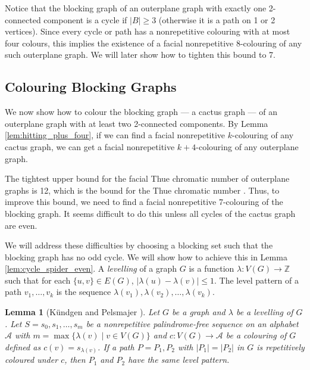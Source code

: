 \documentclass{patmorin}
\newcommand{\integers}{\mathbb{Z}}
\newtheorem{lemma}[theorem]{Lemma}
\begin{document}
Notice that the blocking graph of an outerplane graph with exactly one 2-conn\-ected component is a cycle if $|B|\geq 3$ (otherwise it is a path on 1 or 2 vertices). Since every cycle or path has a nonrepetitive colouring with at most four colours, this implies the existence of a facial nonrepetitive 8-colouring of any such outerplane graph. We will later show how to tighten this bound to 7.

\subsection{Colouring Blocking Graphs}

We now show how to colour the blocking graph --- a cactus graph --- of an outerplane graph with at least two 2-connected components.
By Lemma \ref{lem:hitting_plus_four}, if we can find a facial nonrepetitive $k$-colouring of any cactus graph, we can get a facial nonrepetitive $k+4$-colouring of any outerplane graph. 

The tightest upper bound for the facial Thue chromatic number of outerplane graphs is 12, which is the bound for the Thue chromatic number \cite{barat2007square, kundgen2008nonrepetitive}. Thus, to improve this bound, we need to find a facial nonrepetitive 7-colouring of the blocking graph. It seems difficult to do this unless all cycles of the cactus graph are even. 

We will address these difficulties by choosing a blocking set such that the blocking graph has no odd cycle. We will show how to achieve this in Lemma \ref{lem:cycle_spider_even}. 
A \emph{levelling} of a graph $G$ is a function $\lambda : V(G) \rightarrow \integers$ such that for each $\{u,v\}\in E(G)$, $|\lambda(u)-\lambda(v)|\leq 1$. The level pattern of a path $v_1,\ldots,v_k$ is the sequence $\lambda(v_1),\lambda(v_2),\ldots,\lambda(v_k)$.

\begin{lemma}[K{\"u}ndgen and Pelsmajer \cite{kundgen2008nonrepetitive}]
 Let $G$ be a graph and $\lambda$ be a levelling of $G$. Let $S=s_0,s_1,\ldots,s_m$ be a nonrepetitive palindrome-free sequence on an alphabet $\mathcal{A}$ with $m=\max\{\lambda(v) \;|\; v \in V(G)\}$ and $c : V(G) \rightarrow \mathcal{A}$ be a colouring of $G$ defined as $c(v)=s_{\lambda(v)}$. %
 If a path $P=P_1, P_2$ with $|P_1|=|P_2|$ in $G$ is repetitively coloured under $c$, then $P_1$ and $P_2$ have the same level pattern.
 \label{lem:level_pattern_palindrome_free}
\end{lemma}
\end{document}
